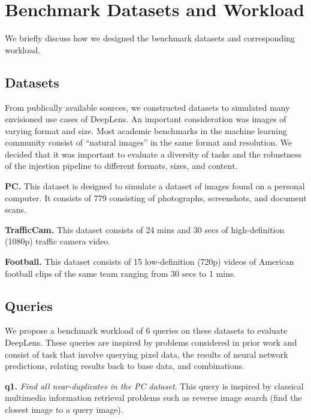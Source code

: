 \section{Benchmark Datasets and Workload}
We briefly discuss how we designed the benchmark datasets and corresponding workload.

\subsection{Datasets}
From publically available sources, we constructed datasets to simulated many envisioned use cases of \textsf{DeepLens}. An important consideration was images of varying format and size. Most academic benchmarks in the machine learning community consist of ``natural images'' in the same format and resolution. We decided that it was important to evaluate a diversity of tasks and the robustness of the injestion pipeline to different formats, sizes, and content. 

\vspace{0.25em} \noindent \textbf{PC.} This dataset is designed to simulate a dataset of images found on a personal computer. It consists of 779 consisting of photographs, screenshots, and document scans. 

\vspace{0.25em} \noindent \textbf{TrafficCam.} This dataset consists of 24 mins and 30 secs of high-definition (1080p) traffic camera video. 

\vspace{0.25em} \noindent \textbf{Football.} This dataset consists of 15 low-definition (720p) videos of American football clips of the same team ranging from 30 secs to 1 mins. 

\subsection{Queries}
We propose a benchmark workload of 6 queries on these datasets to evaluate \textsf{DeepLens}. These queries are inspired by problems considered in prior work and consist of task that involve querying pixel data, the results of neural network predictions, relating results back to base data, and combinations.

\vspace{0.25em} \noindent \textbf{q1.} \emph{Find all near-duplicates in the PC dataset}. This query is inspired by classical multimedia information retrieval problems such as reverse image search (find the closest image to a query image). 

